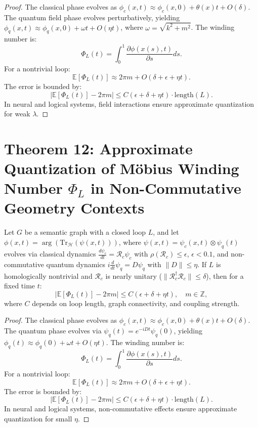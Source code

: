 \documentclass[12pt]{article}
\begin{document}
\begin{proof}
The classical phase evolves as \(\phi_c(x,t) \approx \phi_c(x,0) + \theta(x)t + O(\delta)\). The quantum field phase evolves perturbatively, yielding \(\phi_q(x,t) \approx \phi_q(x,0) + \omega t + O(\eta t)\), where \(\omega = \sqrt{k^2 + m^2}\). The winding number is:
\[
\Phi_L(t) = \int_0^1 \frac{\partial \phi(x(s),t)}{\partial s} ds.
\]
For a nontrivial loop:
\[
\mathbb{E}[\Phi_L(t)] \approx 2\pi m + O(\delta + \epsilon + \eta t).
\]
The error is bounded by:
\[
\left| \mathbb{E}[\Phi_L(t)] - 2\pi m \right| \leq C (\epsilon + \delta + \eta t) \cdot \text{length}(L).
\]
In neural and logical systems, field interactions ensure approximate quantization for weak \(\lambda\).
\end{proof}
\section*{Theorem 12: Approximate Quantization of Möbius Winding Number \(\Phi_L\) in Non-Commutative Geometry Contexts}
\begin{theorem}
Let \(G\) be a semantic graph with a closed loop \(L\), and let \(\phi(x,t) = \arg(\text{Tr}_{\mathcal{H}}(\psi(x,t)))\), where \(\psi(x,t) = \psi_c(x,t) \otimes \psi_q(t)\) evolves via classical dynamics \(\frac{d\psi_c}{dt} = \mathcal{R}_c \psi_c\) with \(\rho(\mathcal{R}_c) \leq \epsilon\), \(\epsilon < 0.1\), and non-commutative quantum dynamics \(i \frac{d}{dt} \psi_q = D \psi_q\) with \(\|D\| \leq \eta\). If \(L\) is homologically nontrivial and \(\mathcal{R}_c\) is nearly unitary (\(\|\mathcal{R}_c^\dagger \mathcal{R}_c\| \leq \delta\)), then for a fixed time \(t\):
\[
\left| \mathbb{E}[\Phi_L(t)] - 2\pi m \right| \leq C (\epsilon + \delta + \eta t), \quad m \in \mathbb{Z},
\]
where \(C\) depends on loop length, graph connectivity, and coupling strength.
\end{theorem}

\begin{proof}
The classical phase evolves as \(\phi_c(x,t) \approx \phi_c(x,0) + \theta(x)t + O(\delta)\). The quantum phase evolves via \(\psi_q(t) = e^{-i D t} \psi_q(0)\), yielding \(\phi_q(t) \approx \phi_q(0) + \omega t + O(\eta t)\). The winding number is:
\[
\Phi_L(t) = \int_0^1 \frac{\partial \phi(x(s),t)}{\partial s} ds.
\]
For a nontrivial loop:
\[
\mathbb{E}[\Phi_L(t)] \approx 2\pi m + O(\delta + \epsilon + \eta t).
\]
The error is bounded by:
\[
\left| \mathbb{E}[\Phi_L(t)] - 2\pi m \right| \leq C (\epsilon + \delta + \eta t) \cdot \text{length}(L).
\]
In neural and logical systems, non-commutative effects ensure approximate quantization for small \(\eta\).
\end{proof}
\end{document}
